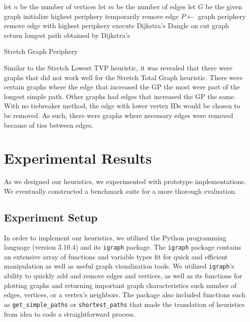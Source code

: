 \documentclass[twocolumn,showpacs,%
  nofootinbib,aps,superscriptaddress,%
  eqsecnum,prd,notitlepage,showkeys,11pt]{article}
\begin{document}
\begin{algorithm}
\begin{algorithmic}

\State let $n$ be the number of vertices 
\State let $m$ be the number of edges
\State let $G$ be the given graph
\State{}
    \State initialize highest periphery
        \State temporarily remove edge
        \State $P \gets$ graph periphery
        \EndIf
    \State remove edge with highest periphery
    \EndFor
\EndFor
\State{}
\State execute Dijkstra's Dangle on cut graph
\State return longest path obtained by Dijkstra's
\end{algorithmic}
\caption{Stretch Graph Periphery}\label{alg:StretchGraphPeriperhy}
\end{algorithm}


Similar to the Stretch Lowest TVP heuristic, it was revealed that there were graphs that did not work well for the Stretch Total Graph heuristic. There were certain graphs where the edge that increased the GP the most were part of the longest simple path. Other graphs had edges that increased the GP the same. With no tiebreaker method, the edge with lower vertex IDs would be chosen to be removed. As such, there were graphs where necessary edges were removed because of ties between edges.

\section{Experimental Results}

As we designed our heuristics, we experimented with prototype implementations. We eventually constructed a benchmark suite for a more thorough evaluation.

\subsection{Experiment Setup}

In order to implement our heuristics, we utilized the Python programming language (version 3.10.4) and its \texttt{igraph} package. The \texttt{igraph} package contains an extensive array of functions and variable types fit for quick and efficient manipulation as well as useful graph visualization tools. We utilized \texttt{igraph}'s ability to quickly add and remove edges and vertices, as well as its functions for plotting graphs and returning important graph characteristics such number of edges, vertices, or a vertex's neighbors. The package also included functions such as \verb+get_simple_paths+ or \verb+shortest_paths+ that made the translation of heuristics from idea to code a straightforward process.
\end{document}
